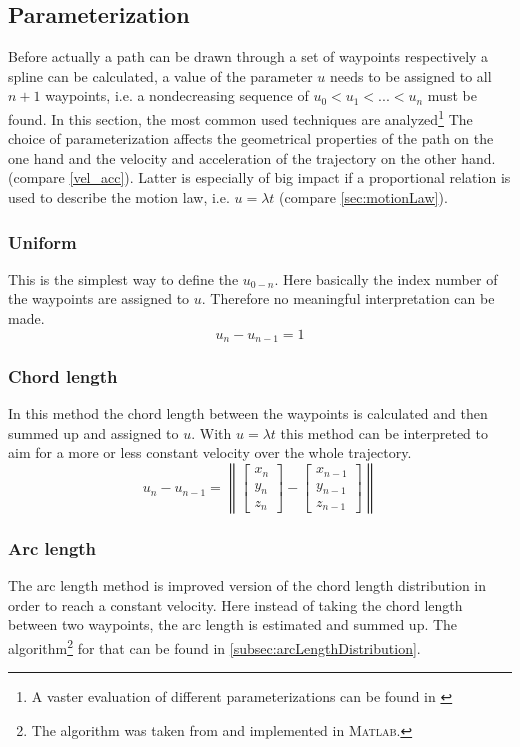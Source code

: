 \subsection{Parameterization}
Before actually a path can be drawn through a set of waypoints respectively a spline can be calculated, a value of the parameter $u$ needs to be assigned to all $n+1$ waypoints, i.e. a nondecreasing sequence of $u_0 < u_1 < ...< u_n$ must be found. In this section, the most common used techniques are analyzed\footnote{A vaster evaluation of different parameterizations can be found in \cite{haron}} The choice of parameterization affects the geometrical properties of the path on the one hand and the velocity and acceleration of the trajectory on the other hand. (compare \eqref{vel_acc}). Latter is especially of big impact if a proportional relation is used to describe the motion law, i.e. $u=\lambda t$ (compare \ref{sec:motionLaw}).

\subsubsection{Uniform}
This is the simplest way to define the $u_{0-n}$. Here basically the index number of the waypoints are assigned to $u$. Therefore no meaningful interpretation can be made.
\begin{equation*}
u_n-u_{n-1}=1
\end{equation*}
\subsubsection{Chord length}
In this method the chord length between the waypoints is calculated and then summed up and assigned to $u$. With $u=\lambda t$ this method can be interpreted to aim for a more or less constant velocity over the whole trajectory.
\begin{equation*}
u_n-u_{n-1}=\left \| \begin{bmatrix}x_n\\y_n\\z_n \end{bmatrix}-\begin{bmatrix}x_{n-1}\\y_{n-1}\\z_{n-1} \end{bmatrix}\right \|
\end{equation*}
\subsubsection{Arc length}
The arc length method is improved version of the chord length distribution in order to reach a constant velocity. Here instead of taking the chord length between two waypoints, the arc length is estimated and summed up. The algorithm\footnote{The algorithm was taken from \cite{engeln} and implemented in \textsc{Matlab}.} for that can be found in \ref{subsec:arcLengthDistribution}.

